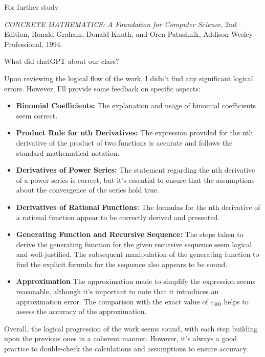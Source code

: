 \documentclass[portrait,fleqn,12pt]{beamer}
\begin{document}
\begin{frame}{For further study}

\emph{CONCRETE MATHEMATICS: A Foundation for Computer Science}, 2nd Edition, Ronald  Graham, 
Donald Knuth, and Oren Patashnik,
Addison-Wesley Professional, 1994.

\end{frame}

\begin{frame}{What did chatGPT about our class?}

Upon reviewing the logical flow of the work, I didn't find any significant logical errors. However, I'll provide some feedback on specific aspects:

\begin{itemize}
    \item \textbf{Binomial Coefficients:} The explanation and usage of binomial coefficients seem correct.

    \item \textbf{Product Rule for nth Derivatives:}  The expression provided for the nth derivative of the product of two functions is accurate and follows the standard mathematical notation.

    \item \textbf{Derivatives of Power Series:}  The statement regarding the nth derivative of a power series is correct, but it's essential to ensure that the assumptions about the convergence of the series hold true.



\end{itemize}

\end{frame}

\begin{frame}
\begin{itemize}

    \item \textbf{Derivatives of Rational Functions:} The formulas for the nth derivative of a rational function appear to be correctly derived and presented.
    
    \item \textbf{Generating Function and Recursive Sequence:} The steps taken to derive the generating function for the given recursive sequence seem logical and well-justified. The subsequent manipulation of the generating function to find the explicit formula for the sequence also appears to be sound.

\item \textbf{Approximation} The approximation made to simplify the expression seems reasonable, although it's important to note that it introduces an approximation error. The comparison with the exact value of $c_{300}$ helps to assess the accuracy of the approximation. 


\end{itemize}
Overall, the logical progression of the work seems sound, with each step building upon the previous ones in a coherent manner. However, it's always a good practice to double-check the calculations and assumptions to ensure accuracy.

\end{frame}
\end{document}
